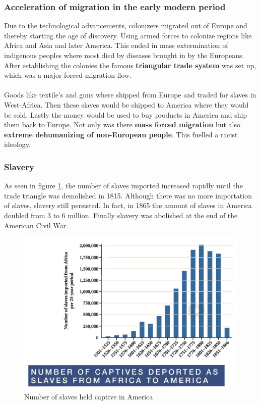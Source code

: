 \documentclass[../summary.tex]{subfiles}
\begin{document}
	\subsubsection{Acceleration of migration in the  early modern period}
	Due to the technological advancements, colonizers migrated out of Europe and thereby starting the age of discovery. Using armed forces to colonize regions like Africa and Asia and later America. This ended in mass extermination of indigenous peoples where most died by diseases brought in by the Europeans. After establishing the colonies the famous \textbf{triangular trade system} was set up, which was a major forced migration flow. 
	\\
	\\
	Goods like textile's and guns where shipped from Europe and traded for slaves in West-Africa. Then these slaves would be shipped to America where they would be sold. Lastly the money would be used to buy products in America and ship them back to Europe.  Not only was there \textbf{mass forced migration} but also \textbf{extreme dehumanizing of non-European people}.  This fuelled a racist ideology.  
	\newpage
	\subsubsection{Slavery}
	As seen in figure \ref{fig:7-slaves-captive}, the number of slaves imported increased rapidly until the trade triangle was demolished in 1815. Although there was no more importation of slaves, slavery still persisted.  In fact, in 1865 the amount of slaves in America doubled from 3 to 6 million. Finally slavery was abolished at the end of the American Civil War.
	
	\begin{figure}[h]
		\centering
		\includegraphics[width=0.7\linewidth]{../images/7-slaves-captive}
		\caption{Number of slaves held captive in America}
		\label{fig:7-slaves-captive}
	\end{figure}
	
\end{document}
